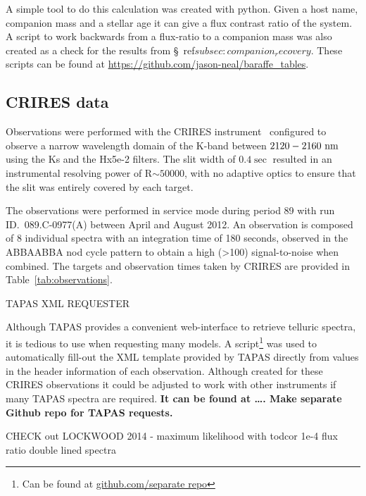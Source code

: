 A simple tool to do this calculation was created with python. Given a host name, companion mass and a stellar age it can give a flux contrast ratio of the system. A script to work backwards from a flux-ratio to a companion mass was also created as a check for the results from \S~ref$ {subsec:companion_recovery}$. These scripts can be found at \url{https://github.com/jason-neal/baraffe_tables}.


\subsection{CRIRES data}
\label{subsec:CRIRESdata}
Observations were performed with the CRIRES instrument~\citep{kaeufl_crires_2004} configured to observe a narrow wavelength domain of the K-band between \(\rm2120-2160~nm \) using the Ks and the Hx5e-2 filters. The slit width of \(0.4\sec \) resulted in an instrumental resolving power of R\(\sim50000 \), with no adaptive optics to ensure that the slit was entirely covered by each target.

The observations were performed in service mode during period 89 with run ID.~089.C-0977(A) between April and August 2012. An observation is composed of 8 individual spectra with an integration time of 180 seconds, observed in the ABBAABBA nod cycle pattern to obtain a high (>100) signal-to-noise when combined. The targets and observation times taken by CRIRES are provided in Table~\ref{tab:observations}.




TAPAS XML REQUESTER

Although TAPAS provides a convenient web-interface to retrieve telluric spectra, it is tedious to use when requesting many models. A script\footnote{Can be found at \url{github.com/separate repo}} was used to automatically fill-out the XML template provided by TAPAS directly from values in the header information of each observation. Although created for these CRIRES observations it could be adjusted to work with other instruments if many TAPAS spectra are required. \textbf{It can be found at \ldots. Make separate Github repo for TAPAS requests.}









CHECK out LOCKWOOD 2014 - maximum likelihood with todcor   1e-4 flux ratio double lined spectra




